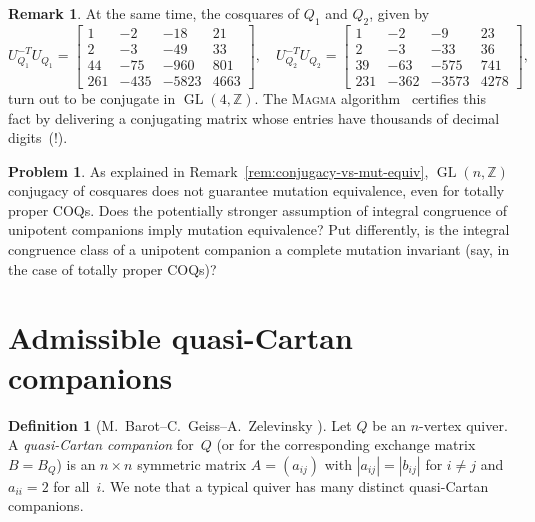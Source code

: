 \documentclass[11pt, letterpaper]{amsart}
\theoremstyle{definition}
\newtheorem{remark}[theorem]{Remark}
\newtheorem{definition}[theorem]{Definition}
\newtheorem{problem}[theorem]{Problem}
\numberwithin{equation}{section}
\def\ZZ{{\mathbb Z}}
\def\GL{{\operatorname{GL}}}
\begin{document}
\begin{remark}
At the same time, the cosquares of $Q_1$ and $Q_2$, given by 
\begin{equation*}
U_{Q_1}^{-T}U_{Q_1}=
\begin{bmatrix}
1  &  -2  &  -18  &   21 \\
2   &  -3  &  -49  &   33 \\
44 &   -75 &  -960 &   801 \\
261 &  -435 & -5823 &  4663
\end{bmatrix}
\!\!, \quad
U_{Q_2}^{-T}U_{Q_2}=
\begin{bmatrix}
 1  &   -2  &   -9  &   23 \\
  2  &   -3 &   -33  &   36 \\
 39 &   -63 &  -575  &  741 \\
 231 &  -362 & -3573  & 4278
\end{bmatrix}
\!\!, 
\end{equation*}
turn out to be conjugate in $\GL(4,\ZZ)$. 
The \textsc{Magma} algorithm~\cite{EHO} certifies this fact
by delivering a conjugating matrix whose entries have thousands of decimal digits~(!).
\end{remark}

\begin{problem}
\label{rem:conj-class-for-tp-determines-mut-class}
As explained in Remark~\ref{rem:conjugacy-vs-mut-equiv},
$\GL(n,\mathbb{Z})$ conjugacy of cosquares does not guarantee mutation equivalence,
even for totally proper COQs. 
Does the potentially stronger assumption of 
integral congruence of unipotent companions
imply mutation equivalence?
%
Put differently, is the integral congruence class of a unipotent companion 
a complete mutation invariant (say, in the case of totally proper COQs)?
\end{problem}


\newpage

\section{Admissible quasi-Cartan companions}
\label{sec:admissible cartan}


\begin{definition}[M.~Barot--C.~Geiss--A.~Zelevinsky \cite{BGZ}]
Let $Q$ be an $n$-vertex quiver.
A \emph{quasi-Cartan companion} for~$Q$ (or for the corresponding exchange matrix~$B=B_Q$)
is an $n \times n$ symmetric matrix $A = (a_{ij})$ 
with $|a_{ij}| = |b_{ij}|$ for $i \neq j$ and $a_{ii} = 2$ for all~$i$.
We note that a typical quiver has many distinct  quasi-Cartan companions. 
\end{definition}
\end{document}
